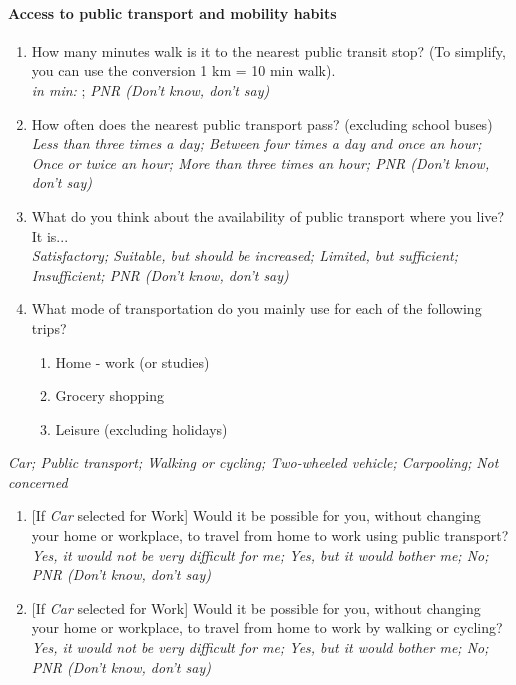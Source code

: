 \documentclass[english,5p,authoryear]{elsarticle}
\begin{document}
\begin{appendices}
\paragraph{Access to public transport and mobility habits}
\begin{enumerate}[resume,leftmargin=*]
\item How many minutes walk is it to the nearest public transit stop? (To
simplify, you can use the conversion 1 km = 10 min walk). \textit{}\\
\textit{in min:} ; \textit{PNR (Don't know, don't say) }
\item How often does the nearest public transport pass? (excluding school
buses) \textit{}\\
\textit{Less than three times a day; Between four times a day and once
an hour; Once or twice an hour; More than three times an hour; PNR
(Don't know, don't say) }
\item What do you think about the availability of public transport where
you live? It is... \textit{}\\
\textit{Satisfactory; Suitable, but should be increased; Limited, but
sufficient; Insufficient; PNR (Don't know, don't say) }
\item What mode of transportation do you mainly use for each of the following
trips?
\begin{enumerate}[resume,leftmargin=*]
\item Home - work (or studies) 
\item Grocery shopping 
\item Leisure (excluding holidays) 
\end{enumerate}
\end{enumerate}
\textit{Car; Public transport; Walking or cycling; Two-wheeled vehicle;
Carpooling;} \textit{Not concerned} 
\begin{enumerate}[resume,leftmargin=*]
\item {[}If \textit{Car }selected for Work{]} Would it be possible for you,
without changing your home or workplace, to travel from home to work
using public transport? \textit{}\\
\textit{Yes, it would not be very difficult for me; Yes, but it would
bother me; No; PNR (Don't know, don't say) }
\item {[}If \textit{Car }selected for Work{]} Would it be possible for you,
without changing your home or workplace, to travel from home to work
by walking or cycling? \textit{}\\
\textit{Yes, it would not be very difficult for me; Yes, but it would
bother me; No; PNR (Don't know, don't say) }
\end{enumerate}


\end{appendices}
\end{document}
